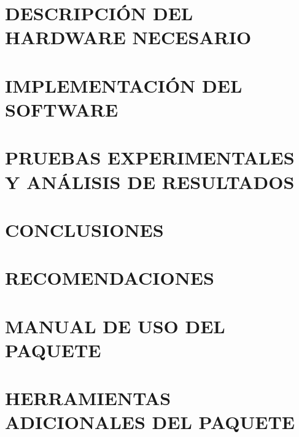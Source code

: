 \documentclass[letterpaper,titlepage,12pt,oneside,spanish,final]{report_eie}
\numberwithin{equation}{chapter}%
\numberwithin{figure}{chapter}%
\numberwithin{table}{chapter}%
\numberwithin{definition}{chapter}%
\numberwithin{lemma}{chapter}%
\numberwithin{theorem}{chapter}%
\numberwithin{corollary}{chapter}%
\numberwithin{condition}{chapter}%
\numberwithin{criterion}{chapter}%
\numberwithin{problem}{chapter}%
\numberwithin{property}{chapter}%
\numberwithin{proposition}{chapter}%
\numberwithin{solution}{chapter}%
\numberwithin{conjecture}{chapter}%
\begin{document}
\chapter{DESCRIPCIÓN DEL HARDWARE NECESARIO}\label{CAP:hardware}
  
\chapter{IMPLEMENTACIÓN DEL SOFTWARE}\label{CAP:software}
  

\chapter{PRUEBAS EXPERIMENTALES Y ANÁLISIS DE RESULTADOS}\label{CAP:resultados}


\chapter{CONCLUSIONES}\label{CAP:conclu}


\chapter{RECOMENDACIONES}\label{CAP:recomendaciones}


\appendix
\chapter{MANUAL DE USO DEL PAQUETE}\label{CAP:anexo0}
%

\chapter{HERRAMIENTAS ADICIONALES DEL PAQUETE}\label{CAP:anexo1}
%
\end{document}
